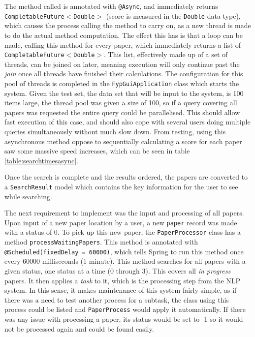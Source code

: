 The method called is annotated with \texttt{@Async}, and immediately returns \texttt{CompletableFuture$<$Double$>$} (score is measured in the \texttt{Double} data type), which causes the process calling the method to carry on, as a new thread is made to do the actual method computation. The effect this has is that a loop can be made, calling this method for every paper, which immediately returns a list of \texttt{CompletableFuture$<$Double$>$}. This list, effectively made up of a set of threads, can be joined on later, meaning execution will only continue past the \textit{join} once all threads have finished their calculations. The configuration for this pool of threads is completed in the \texttt{FypGuiApplication} class which starts the system. Given the test set, the data set that will be input to the system, is 100 items large, the thread pool was given a size of 100, so if a query covering all papers was requested the entire query could be parallelised. This should allow fast execution of this case, and should also cope with several users doing multiple queries simultaneously without much slow down. From testing, using this asynchronous method oppose to sequentially calculating a score for each paper saw some massive speed increases, which can be seen in table \ref{table:searchtimesasync}. 

Once the search is complete and the results ordered, the papers are converted to a \texttt{SearchResult} model which contains the key information for the user to see while searching.

The next requirement to implement was the input and processing of all papers. Upon input of a new paper location by a user, a new \texttt{paper} record was made with a status of 0. To pick up this new paper, the \texttt{PaperProcessor} class has a method \texttt{processWaitingPapers}. This method is annotated with \texttt{@Scheduled(fixedDelay = 60000)}, which tells Spring to run this method once every 60000 milliseconds (1 minute). This method searches for all papers with a given status, one status at a time (0 through 3). This covers all \textit{in progress} papers. It then applies a \textit{task} to it, which is the processing step from the NLP system. In this sense, it makes maintenance of this system fairly simple, as if there was a need to test another process for a subtask, the class using this process could be listed and \texttt{PaperProcess} would apply it automatically. If there was any issue with processing a paper, its status would be set to -1 so it would not be processed again and could be found easily.


